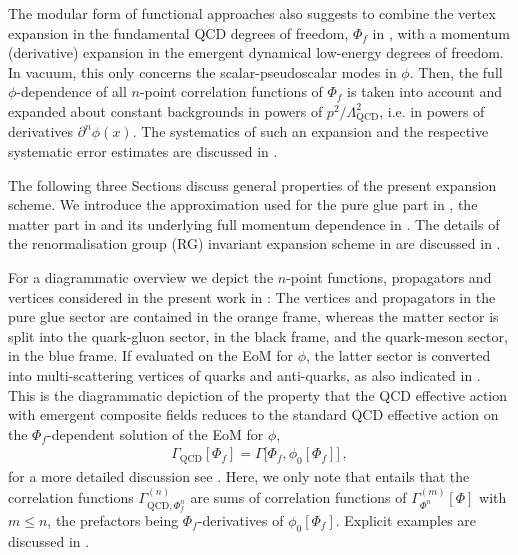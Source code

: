 \documentclass[aps,twocolumn,prd,superscriptaddress]{revtex4-2}
\begin{document}
The modular form of functional approaches also suggests to combine the vertex expansion in the fundamental QCD degrees of freedom, $\Phi_f$ in , with a momentum (derivative) expansion in the emergent dynamical low-energy degrees of freedom. In vacuum, this only concerns the scalar-pseudoscalar modes in $\phi$. Then, the full $\phi$-dependence of all $n$-point correlation functions of $\Phi_f$ is taken into account and expanded about constant backgrounds in powers of $p^2/\Lambda_\textrm{QCD}^2$, i.e. in powers of derivatives $\partial^n \phi(x)$. 
The systematics of such an expansion and the respective systematic error estimates are discussed in . 

The following three Sections discuss general properties of the present expansion scheme. We introduce the approximation used for the pure glue part in , the matter part in  and its underlying full momentum dependence in . The details of the renormalisation group (RG) invariant expansion scheme in are discussed in .

For a diagrammatic overview we depict the $n$-point functions, propagators and vertices considered in the present work in : The vertices and propagators in the pure glue sector are contained in the orange frame, whereas the matter sector is split into the quark-gluon sector, in the black frame, and the quark-meson sector, in the blue frame. If evaluated on the EoM for $\phi$, the latter sector is converted into multi-scattering vertices of quarks and anti-quarks, as also indicated in . This is the diagrammatic depiction of the property that the QCD effective action with emergent composite fields reduces to the standard QCD
effective action on the $\Phi_f$-dependent solution of the EoM for $\phi$, 
%
\begin{align}
	\Gamma_\textrm{QCD}[ \Phi_f]= \Gamma\bigl[ \Phi_f, \phi_0\left[\Phi_f\right]\bigr]\,, 
\label{eq:GComp=GQCD}
\end{align}
%
for a more detailed discussion see \cite{Fu:2019hdw}. 
Here, we only note that  entails that the correlation functions $\Gamma^{(n)}_{\textrm{QCD},\Phi_f^n}$ are sums of correlation functions of $\Gamma^{(m)}_{\Phi^n}[ \Phi]$ with $m\leq n$, the prefactors being $\Phi_f$-derivatives of $ \phi_0[\Phi_f]$. Explicit examples are discussed in \cite{Fu:2019hdw}. 
\end{document}
